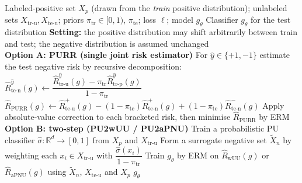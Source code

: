 \documentclass{article}
\begin{document}
\begin{algorithm}[!h]
\renewcommand{\algorithmicrequire}{\textbf{Input:}} %
\renewcommand{\algorithmicensure}{\textbf{Output:}} %
	\caption{aPU learning: PURR and the two-step PU2wUU / PU2aPNU} %
	\begin{algorithmic}[1] %
	    \REQUIRE
	    Labeled-positive set $X_{p}$ (drawn from the \emph{train} positive distribution);
	    unlabeled sets $X_{\mathrm{tr\text{-}u}},X_{\mathrm{te\text{-}u}}$;
	    priors $\pi_{\mathrm{tr}}\in[0,1)$, $\pi_{\mathrm{te}}$; loss $\ell$; model $g_{\theta}$
	    \ENSURE
	    Classifier $g_{\theta}$ for the test distribution
	    \STATE \textbf{Setting:} the positive distribution may shift arbitrarily between train and test;
	    the negative distribution is assumed unchanged %
	    \\\hrulefill
	    \STATE \textbf{Option A: PURR (single joint risk estimator)}
	    \STATE For $\hat{y}\in\{+1,-1\}$ estimate the test negative risk by recursive decomposition:
	    \STATE \quad $\hat{R}_{\mathrm{te\text{-}n}}^{\hat{y}}(g)\leftarrow \dfrac{\hat{R}_{\mathrm{tr\text{-}u}}^{\hat{y}}(g)-\pi_{\mathrm{tr}}\hat{R}_{\mathrm{tr\text{-}p}}^{\hat{y}}(g)}{1-\pi_{\mathrm{tr}}}$ %
	    \STATE $\hat{R}_{\mathrm{PURR}}(g)\leftarrow \hat{R}_{\mathrm{te\text{-}u}}^{+}(g)-(1-\pi_{\mathrm{te}})\hat{R}_{\mathrm{te\text{-}n}}^{+}(g)+(1-\pi_{\mathrm{te}})\hat{R}_{\mathrm{te\text{-}n}}^{-}(g)$ %
	    \STATE Apply absolute-value correction to each bracketed risk, then minimise $\hat{R}_{\mathrm{PURR}}$ by ERM %
	    \\\hrulefill
	    \STATE \textbf{Option B: two-step (PU2wUU / PU2aPNU)}
	    \STATE Train a probabilistic PU classifier $\hat{\sigma}:\mathbb{R}^{d}\to[0,1]$ from $X_{p}$ and $X_{\mathrm{tr\text{-}u}}$ %
	    \STATE Form a surrogate negative set $\widetilde{X}_{n}$ by weighting each $x_{i}\in X_{\mathrm{tr\text{-}u}}$ with $\dfrac{\hat{\sigma}(x_{i})}{1-\pi_{\mathrm{tr}}}$ %
	    \STATE Train $g_{\theta}$ by ERM on $\hat{R}_{\mathrm{wUU}}(g)$ or $\hat{R}_{\mathrm{aPNU}}(g)$ using $\widetilde{X}_{n}$, $X_{\mathrm{te\text{-}u}}$ and $X_{p}$
		\RETURN $g_{\theta}$
	\end{algorithmic}
\end{algorithm}
\end{document}
